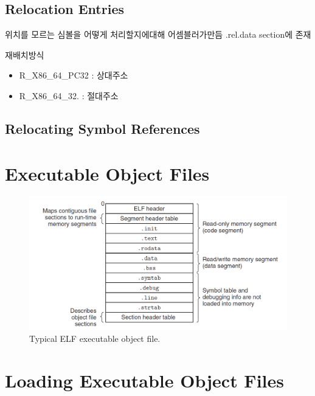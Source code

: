 \subsection{Relocation Entries}
위치를 모르는 심볼을 어떻게 처리할지에대해 어셈블러가만듬
.rel.data section에 존재

재배치방식
\begin{itemize}
    \item R_X86_64_PC32 : 상대주소
    \item R_X86_64_32. : 절대주소
\end{itemize}

\subsection{Relocating Symbol References}


\section{Executable Object Files}


\begin{figure}[h!]
    \centering
    \includegraphics[scale=0.4]{pic/section7/pic4.png}
    \caption{Typical ELF executable object file.}
\end{figure}

\section{Loading Executable Object Files}

